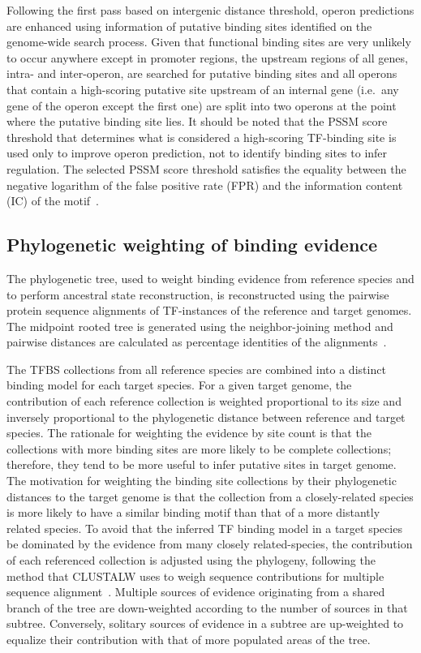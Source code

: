Following the first pass based on intergenic distance threshold, operon
predictions are enhanced using information of putative binding sites identified
on the genome-wide search process. Given that functional binding sites are very
unlikely to occur anywhere except in promoter regions, the upstream regions of
all genes, intra- and inter-operon, are searched for putative binding sites and
all operons that contain a high-scoring putative site upstream of an internal
gene (i.e.\ any gene of the operon except the first one) are split into two
operons at the point where the putative binding site lies. It should be noted
that the PSSM score threshold that determines what is considered a high-scoring
TF-binding site is used only to improve operon prediction, not to identify
binding sites to infer regulation. The selected PSSM score threshold satisfies
the equality between the negative logarithm of the false positive rate (FPR)
and the information content (IC) of the motif~\cite{hertz1999identifying}.

\subsection{Phylogenetic weighting of binding evidence}

The phylogenetic tree, used to weight binding evidence from reference species
and to perform ancestral state reconstruction, is reconstructed using the
pairwise protein sequence alignments of TF-instances of the reference and target
genomes. The midpoint rooted tree is generated using the neighbor-joining
method and pairwise distances are calculated as percentage identities of the
alignments~\cite{saitou1987neighbor}.

The TFBS collections from all reference species are combined into a distinct
binding model for each target species. For a given target genome, the
contribution of each reference collection is weighted proportional to its size
and inversely proportional to the phylogenetic distance between reference and
target species. The rationale for weighting the evidence by site count is that
the collections with more binding sites are more likely to be complete
collections; therefore, they tend to be more useful to infer putative sites in
target genome. The motivation for weighting the binding site collections by
their phylogenetic distances to the target genome is that the collection from a
closely-related species is more likely to have a similar binding motif than
that of a more distantly related species. To avoid that the inferred TF binding
model in a target species be dominated by the evidence from many closely
related-species, the contribution of each referenced collection is adjusted
using the phylogeny, following the method that CLUSTALW uses to weigh sequence
contributions for multiple sequence
alignment~\cite{thompson1994clustal}. Multiple sources of evidence originating
from a shared branch of the tree are down-weighted according to the number of
sources in that subtree. Conversely, solitary sources of evidence in a subtree
are up-weighted to equalize their contribution with that of more populated
areas of the tree.


